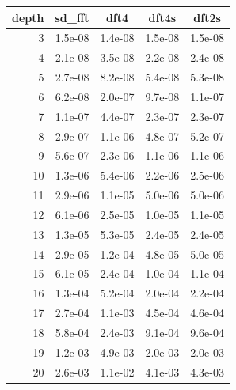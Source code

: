 \documentclass[a4paper]{article}
\begin{document}
\begin{center}
    \begin{longtable}{|r|*{4}{c|}}
        \hline
        \rowcolor{myGray}
        depth & sd\_fft & dft4 & dft4s & dft2s \\
        \hline
        \cellcolor{myGray} 3 & 1.5e-08 & 1.4e-08 & 1.5e-08 & 1.5e-08 \\
        \hline
        \cellcolor{myGray} 4 & 2.1e-08 & 3.5e-08 & 2.2e-08 & 2.4e-08 \\
        \hline
        \cellcolor{myGray} 5 & 2.7e-08 & 8.2e-08 & 5.4e-08 & 5.3e-08 \\
        \hline
        \cellcolor{myGray} 6 & 6.2e-08 & 2.0e-07 & 9.7e-08 & 1.1e-07 \\
        \hline
        \cellcolor{myGray} 7 & 1.1e-07 & 4.4e-07 & 2.3e-07 & 2.3e-07 \\
        \hline
        \cellcolor{myGray} 8 & 2.9e-07 & 1.1e-06 & 4.8e-07 & 5.2e-07 \\
        \hline
        \cellcolor{myGray} 9 & 5.6e-07 & 2.3e-06 & 1.1e-06 & 1.1e-06 \\
        \hline
        \cellcolor{myGray} 10 & 1.3e-06 & 5.4e-06 & 2.2e-06 & 2.5e-06 \\
        \hline
        \cellcolor{myGray} 11 & 2.9e-06 & 1.1e-05 & 5.0e-06 & 5.0e-06 \\
        \hline
        \cellcolor{myGray} 12 & 6.1e-06 & 2.5e-05 & 1.0e-05 & 1.1e-05 \\
        \hline
        \cellcolor{myGray} 13 & 1.3e-05 & 5.3e-05 & 2.4e-05 & 2.4e-05 \\
        \hline
        \cellcolor{myGray} 14 & 2.9e-05 & 1.2e-04 & 4.8e-05 & 5.0e-05 \\
        \hline
        \cellcolor{myGray} 15 & 6.1e-05 & 2.4e-04 & 1.0e-04 & 1.1e-04 \\
        \hline
        \cellcolor{myGray} 16 & 1.3e-04 & 5.2e-04 & 2.0e-04 & 2.2e-04 \\
        \hline
        \cellcolor{myGray} 17 & 2.7e-04 & 1.1e-03 & 4.5e-04 & 4.6e-04 \\
        \hline
        \cellcolor{myGray} 18 & 5.8e-04 & 2.4e-03 & 9.1e-04 & 9.6e-04 \\
        \hline
        \cellcolor{myGray} 19 & 1.2e-03 & 4.9e-03 & 2.0e-03 & 2.0e-03 \\
        \hline
        \cellcolor{myGray} 20 & 2.6e-03 & 1.1e-02 & 4.1e-03 & 4.3e-03 \\

\end{longtable}
\end{center}
\end{document}
